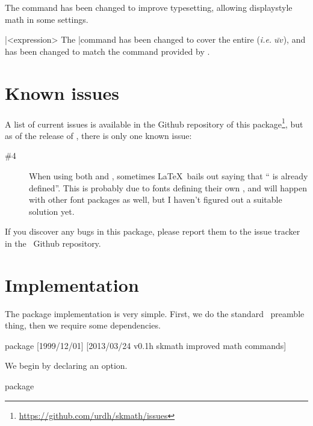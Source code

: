 \documentclass[commonsets,load]{skdoc}
\begin{document}
  \DescribeMacro{}
  The \Macro\frac command has been changed to improve typesetting,
  allowing displaystyle math in some settings.
 
  \DescribeMacro\bar{<expression>}
  \DescribeMacro{}
  The \Macro\bar command has been changed to cover the entire 
   (\emph{i.e.} \(\bar{uv}\)), and \Macro\vec has
  been changed to match the  command provided by 
  .

  \section{Known issues}
  A list of current issues is available in the Github repository of this
  package\footnote{\url{https://github.com/urdh/skmath/issues}}, but as
  of the release of \theversion, there is only one known issue:
  \begin{description}
      \item[\#4]  When using both  and \thepackage, sometimes
                  \LaTeX\ bails out saying that \enquote{ is already
                  defined}. This is probably due to fonts defining their own
                  , and will happen with other font packages as well,
                  but I haven't figured out a suitable solution yet.
  \end{description}
  If you discover any bugs in this package, please report them to the issue
  tracker in the \thepackage\ Github repository.

  \section{Implementation}
  The package implementation is very simple. First, we do the standard
  \LaTeXe\ preamble thing, then we require some dependencies.
\begin{MacroCode}{package}
[1999/12/01]
%
    [2013/03/24 v0.1h skmath improved math commands]
\RequirePackage{xparse}
\RequirePackage{kvoptions,amssymb,mathtools,xfrac,isomath}
\end{MacroCode}

  We begin by declaring an option.
\begin{MacroCode}{package}
\ProcessKeyvalOptions*
\end{MacroCode}
\end{document}
